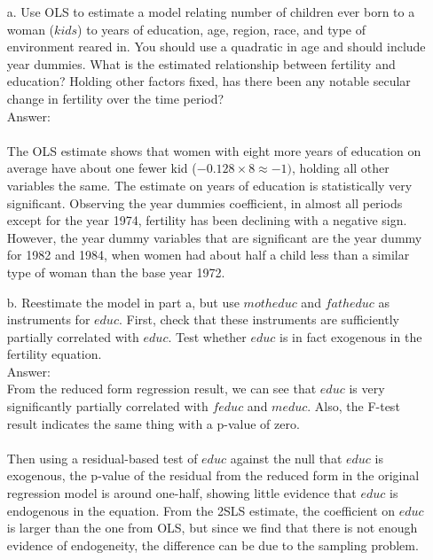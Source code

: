 \documentclass[10pt]{article}
\begin{document}
\begin{enumerate}
\item[a.] Use OLS to estimate a model relating number of children ever born to a woman ($kids$) to years of education, age, region, race, and type of environment reared in. You should use a quadratic in age and should include year dummies. What is the estimated relationship between fertility and education? Holding other factors fixed, has there been any notable secular change in fertility over the time period?
\\ Answer: \\ \\

The OLS estimate shows that women with eight more years of education on average have about one fewer kid ($-0.128\times8\approx -1)$, holding all other variables the same. The estimate on years of education is statistically very significant. Observing the year dummies coefficient, in almost all periods except for the year 1974, fertility has been declining with a negative sign. However, the year dummy variables that are significant are the year dummy for 1982 and 1984, when women had about half a child less than a similar type of woman than the base year 1972.

\item[b.] Reestimate the model in part a, but use $motheduc$ and $fatheduc$ as instruments for $educ$. First, check that these instruments are sufficiently partially correlated with $educ$. Test whether $educ$ is in fact exogenous in the fertility equation.
\\ Answer: \\
From the reduced form regression result, we can see that $educ$ is very significantly partially correlated with $feduc$ and $meduc$. Also, the F-test result indicates the same thing with a p-value of zero.\\ \\

Then using a residual-based test of $educ$ against the null that $educ$ is exogenous, the p-value of the residual from the reduced form in the original regression model is around one-half, showing little evidence that $educ$ is endogenous in the equation. From the 2SLS estimate, the coefficient on $educ$ is larger than the one from OLS, but since we find that there is not enough evidence of endogeneity, the difference can be due to the sampling problem.  


\end{enumerate}
\end{document}
